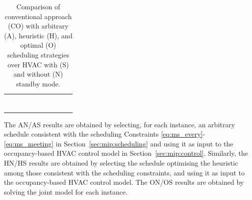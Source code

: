 \begin{table}[t]
\centering
\begin{tabular}{p{0.1\linewidth} p{0.25\linewidth} p{0.25\linewidth} p{0.25\linewidth}}
\hline \centering{Strategy}  & \centering{Avg. energy consumption (kWh)} &  \centering{\% Consumption vs. CO} &  \centering{\% Excess Consumption vs. OS} \tabularnewline
\hline \centering{CO}  & \centering{522.86} &  \centering{Baseline} & \centering{\mbox{-}} \tabularnewline
\hline \centering{AN}  & \centering{212.14} &  \centering{40.57\%} &  \centering{74.84\%}\tabularnewline
\hline \centering{AS}  & \centering{199.94} &  \centering{38.24\%} &  \centering{64.78\%}\tabularnewline
\hline \centering{HN}  & \centering{184.26} &  \centering{35.24\%} &  \centering{51.86\%}\tabularnewline
\hline \centering{HS}  & \centering{177.32} &  \centering{33.91\%} &  \centering{46.14\%}\tabularnewline
\hline \centering{ON}  & \centering{124.13} &  \centering{23.74\%} &  \centering{2.30\%}\tabularnewline
\hline \centering{OS}  & \centering{121.34} &  \centering{23.21\%} &  \centering{Baseline} \tabularnewline
\hline
\end{tabular}
	\caption{Comparison of conventional approach (CO) with arbitrary (A), heuristic (H), and optimal (O) scheduling strategies over HVAC with (S) and without (N) standby mode.}
	\label{tab:sche_e}
\end{table}

The AN/AS results are obtained by selecting, for each instance, an arbitrary schedule consistent with the scheduling Constraints \eqref{eq:ms_every}-\eqref{eq:ms_meeting} in Section~\ref{sec:mip:scheduling} and using it as input to the occupancy-based HVAC control model in Section~\ref{sec:mip:control}. Similarly, the HN/HS results are obtained by selecting the schedule optimising the heuristic among those consistent with the scheduling constraints, and using it as input to the occupancy-based HVAC control model. The ON/OS results are obtained by solving the joint model for each instance.

